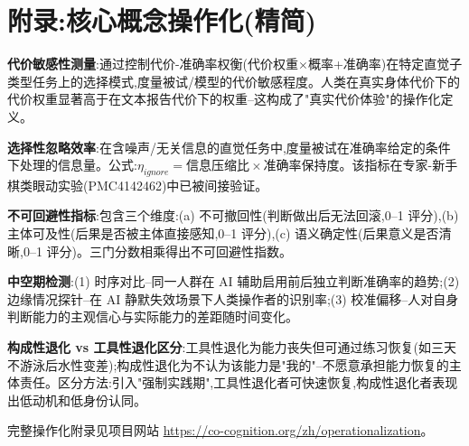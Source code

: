 \documentclass[11pt,a4paper]{article}
\begin{document}


\newpage
\appendix
\section{附录:核心概念操作化(精简)}

\textbf{代价敏感性测量}:通过控制代价-准确率权衡(代价权重$\times$概率+准确率)在特定直觉子类型任务上的选择模式,度量被试/模型的代价敏感程度。人类在真实身体代价下的代价权重显著高于在文本报告代价下的权重--这构成了"真实代价体验"的操作化定义。

\textbf{选择性忽略效率}:在含噪声/无关信息的直觉任务中,度量被试在准确率给定的条件下处理的信息量。公式:$\eta_{ignore} = \text{信息压缩比} \times \text{准确率保持度}$。该指标在专家-新手棋类眼动实验(PMC4142462)中已被间接验证。

\textbf{不可回避性指标}:包含三个维度:(a) 不可撤回性(判断做出后无法回滚,0--1 评分),(b) 主体可及性(后果是否被主体直接感知,0--1 评分),(c) 语义确定性(后果意义是否清晰,0--1 评分)。三门分数相乘得出不可回避性指数。

\textbf{中空期检测}:(1) 时序对比--同一人群在 AI 辅助启用前后独立判断准确率的趋势;(2) 边缘情况探针--在 AI 静默失效场景下人类操作者的识别率;(3) 校准偏移--人对自身判断能力的主观信心与实际能力的差距随时间变化。

\textbf{构成性退化 vs 工具性退化区分}:工具性退化为能力丧失但可通过练习恢复(如三天不游泳后水性变差);构成性退化为不认为该能力是"我的"--不愿意承担能力恢复的主体责任。区分方法:引入"强制实践期",工具性退化者可快速恢复,构成性退化者表现出低动机和低身份认同。

完整操作化附录见项目网站 \url{https://co-cognition.org/zh/operationalization}。
\end{document}
